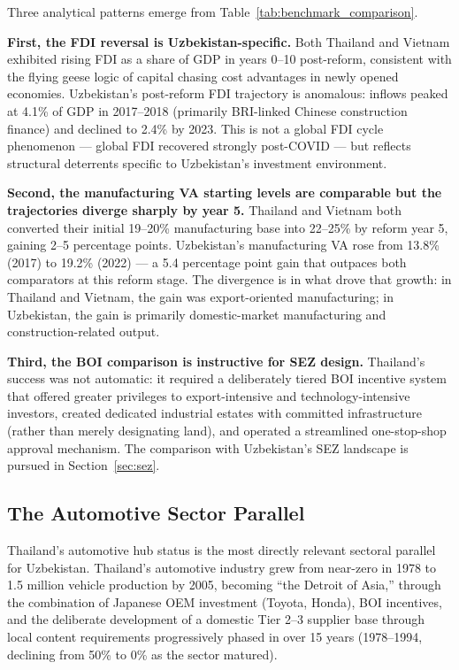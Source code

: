 Three analytical patterns emerge from Table~\ref{tab:benchmark_comparison}.

\textbf{First, the FDI reversal is Uzbekistan-specific.} Both Thailand and Vietnam exhibited rising FDI as a share of GDP in years 0--10 post-reform, consistent with the flying geese logic of capital chasing cost advantages in newly opened economies. Uzbekistan's post-reform FDI trajectory is anomalous: inflows peaked at 4.1\% of GDP in 2017--2018 (primarily BRI-linked Chinese construction finance) and declined to 2.4\% by 2023. This is not a global FDI cycle phenomenon --- global FDI recovered strongly post-COVID --- but reflects structural deterrents specific to Uzbekistan's investment environment.

\textbf{Second, the manufacturing VA starting levels are comparable but the trajectories diverge sharply by year 5.} Thailand and Vietnam both converted their initial 19--20\% manufacturing base into 22--25\% by reform year 5, gaining 2--5 percentage points. Uzbekistan's manufacturing VA rose from 13.8\% (2017) to 19.2\% (2022) --- a 5.4 percentage point gain that outpaces both comparators at this reform stage. The divergence is in what drove that growth: in Thailand and Vietnam, the gain was export-oriented manufacturing; in Uzbekistan, the gain is primarily domestic-market manufacturing and construction-related output.

\textbf{Third, the BOI comparison is instructive for SEZ design.} Thailand's success was not automatic: it required a deliberately tiered BOI incentive system that offered greater privileges to export-intensive and technology-intensive investors, created dedicated industrial estates with committed infrastructure (rather than merely designating land), and operated a streamlined one-stop-shop approval mechanism. The comparison with Uzbekistan's SEZ landscape is pursued in Section~\ref{sec:sez}.

\subsection{The Automotive Sector Parallel}

Thailand's automotive hub status is the most directly relevant sectoral parallel for Uzbekistan. Thailand's automotive industry grew from near-zero in 1978 to 1.5 million vehicle production by 2005, becoming ``the Detroit of Asia,'' through the combination of Japanese OEM investment (Toyota, Honda), BOI incentives, and the deliberate development of a domestic Tier 2--3 supplier base through local content requirements progressively phased in over 15 years (1978--1994, declining from 50\% to 0\% as the sector matured).


